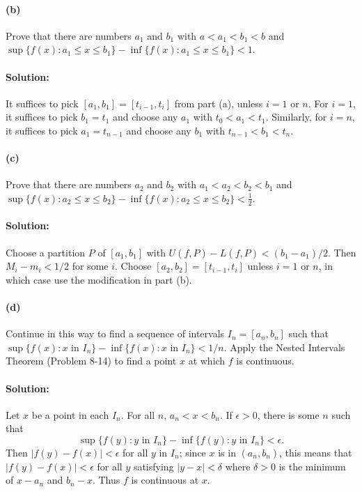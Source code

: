 \documentclass{article}
\begin{document}
\paragraph{(b)} Prove that there are numbers $a_1$ and $b_1$ with $a < a_1 <
b_1 < b$ and $\sup\{f(x): a_1 \leq x \leq b_1\} - \inf\{f(x): a_1 \leq x \leq
b_1\} < 1$.

\paragraph{Solution:} It suffices to pick $[a_1, b_1] = [t_{i - 1}, t_i]$ from
part (a), unless $i = 1$ or $n$. For $i = 1$, it suffices to pick $b_1 = t_1$
and choose any $a_1$ with $t_0 < a_1 < t_1$. Similarly, for $i = n$, it
suffices to pick $a_1 = t_{n - 1}$ and choose any $b_1$ with $t_{n - 1} < b_1 <
t_n$.

\paragraph{(c)} Prove that there are numbers $a_2$ and $b_2$ with $a_1 < a_2 <
b_2 < b_1$ and $\sup\{f(x): a_2 \leq x \leq b_2\} - \inf\{f(x): a_2 \leq x \leq
b_2\} < \frac{1}{2}$.

\paragraph{Solution:} Choose a partition $P$ of $[a_1, b_1]$ with $U(f, P) -
L(f, P) < (b_1 - a_1)/2$. Then $M_i - m_i < 1/2$ for some $i$. Choose $[a_2,
b_2] = [t_{i - 1}, t_i]$ unless $i = 1$ or $n$, in which case use the
modification in part (b).

\paragraph{(d)} Continue in this way to find a sequence of intervals $I_n =
[a_n, b_n]$ such that $\sup\{f(x): x \text{ in } I_n\} - \inf\{f(x): x
\text{ in } I_n\} < 1/n$. Apply the Nested Intervals Theorem (Problem 8-14) to
find a point $x$ at which $f$ is continuous.

\paragraph{Solution:} Let $x$ be a point in each $I_n$. For all $n$, $a_n < x <
b_n$. If $\epsilon > 0$, there is some $n$ such that \begin{equation*}
  \sup\{f(y): y \text{ in } I_n\} - \inf\{f(y): y \text{ in } I_n\} < \epsilon.
\end{equation*} Then $|f(y) - f(x)| < \epsilon$ for all $y$ in $I_n$; since $x$
is in $(a_n, b_n)$, this means that $|f(y) - f(x)| < \epsilon$ for all $y$
satisfying $|y - x| < \delta$ where $\delta > 0$ is the minimum of $x - a_n$
and $b_n - x$. Thus $f$ is continuous at $x$.
\end{document}
